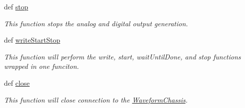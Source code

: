 \begin{DoxyCompactItemize}
def \hyperlink{class_chassis_8git_1_1_waveform_chassis_1_1_w_c_low_level_a0f23609abb797d0bed574fcb92f70e2d}{stop}
\begin{DoxyCompactList}\small\item\em This function stops the analog and digital output generation. \end{DoxyCompactList}\item 
def \hyperlink{class_chassis_8git_1_1_waveform_chassis_1_1_w_c_low_level_abf6ce0d8a2409b2cc20f332b9c4c0ce8}{write\-Start\-Stop}
\begin{DoxyCompactList}\small\item\em This function will perform the write, start, wait\-Until\-Done, and stop functions wrapped in one funciton. \end{DoxyCompactList}\item 
def \hyperlink{class_chassis_8git_1_1_waveform_chassis_1_1_w_c_low_level_adf63f261233c5cdea70dc4a076d37597}{close}
\begin{DoxyCompactList}\small\item\em This function will close connection to the \hyperlink{class_chassis_8git_1_1_waveform_chassis_1_1_waveform_chassis}{Waveform\-Chassis}. \end{DoxyCompactList}\end{DoxyCompactItemize}
